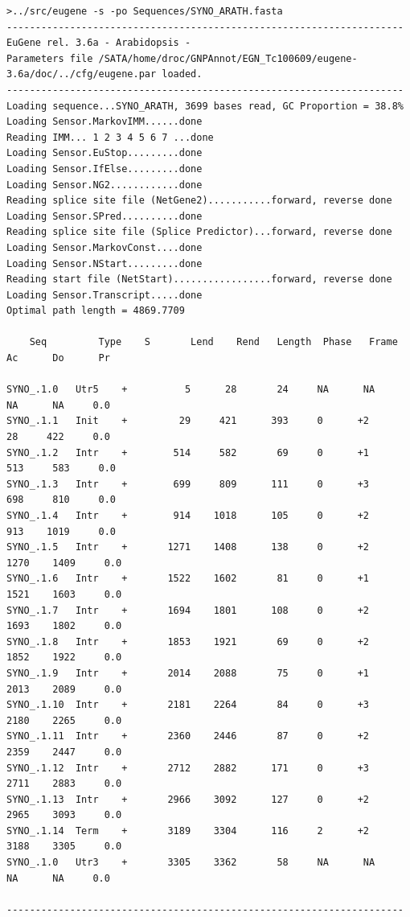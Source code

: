 \documentclass[a4paper,titlepage]{report}
\begin{document}
\begin{Verbatim}[fontsize=\scriptsize]
>../src/eugene -s -po Sequences/SYNO_ARATH.fasta
---------------------------------------------------------------------
EuGene rel. 3.6a - Arabidopsis -
Parameters file /SATA/home/droc/GNPAnnot/EGN_Tc100609/eugene-3.6a/doc/../cfg/eugene.par loaded.
---------------------------------------------------------------------
Loading sequence...SYNO_ARATH, 3699 bases read, GC Proportion = 38.8%
Loading Sensor.MarkovIMM......done
Reading IMM... 1 2 3 4 5 6 7 ...done
Loading Sensor.EuStop.........done
Loading Sensor.IfElse.........done
Loading Sensor.NG2............done
Reading splice site file (NetGene2)...........forward, reverse done
Loading Sensor.SPred..........done
Reading splice site file (Splice Predictor)...forward, reverse done
Loading Sensor.MarkovConst....done
Loading Sensor.NStart.........done
Reading start file (NetStart).................forward, reverse done
Loading Sensor.Transcript.....done
Optimal path length = 4869.7709

    Seq         Type    S       Lend    Rend   Length  Phase   Frame      Ac      Do      Pr

SYNO_.1.0	Utr5    +          5      28       24     NA      NA      NA      NA     0.0  
SYNO_.1.1	Init    +         29     421      393     0      +2      28     422     0.0  
SYNO_.1.2	Intr    +        514     582       69     0      +1     513     583     0.0  
SYNO_.1.3	Intr    +        699     809      111     0      +3     698     810     0.0  
SYNO_.1.4	Intr    +        914    1018      105     0      +2     913    1019     0.0  
SYNO_.1.5	Intr    +       1271    1408      138     0      +2    1270    1409     0.0  
SYNO_.1.6	Intr    +       1522    1602       81     0      +1    1521    1603     0.0  
SYNO_.1.7	Intr    +       1694    1801      108     0      +2    1693    1802     0.0  
SYNO_.1.8	Intr    +       1853    1921       69     0      +2    1852    1922     0.0  
SYNO_.1.9	Intr    +       2014    2088       75     0      +1    2013    2089     0.0  
SYNO_.1.10	Intr    +       2181    2264       84     0      +3    2180    2265     0.0  
SYNO_.1.11	Intr    +       2360    2446       87     0      +2    2359    2447     0.0  
SYNO_.1.12	Intr    +       2712    2882      171     0      +3    2711    2883     0.0  
SYNO_.1.13	Intr    +       2966    3092      127     0      +2    2965    3093     0.0  
SYNO_.1.14	Term    +       3189    3304      116     2      +2    3188    3305     0.0  
SYNO_.1.0	Utr3    +       3305    3362       58     NA      NA      NA      NA     0.0  

---------------------------------------------------------------------
 
\end{Verbatim}
\end{document}
